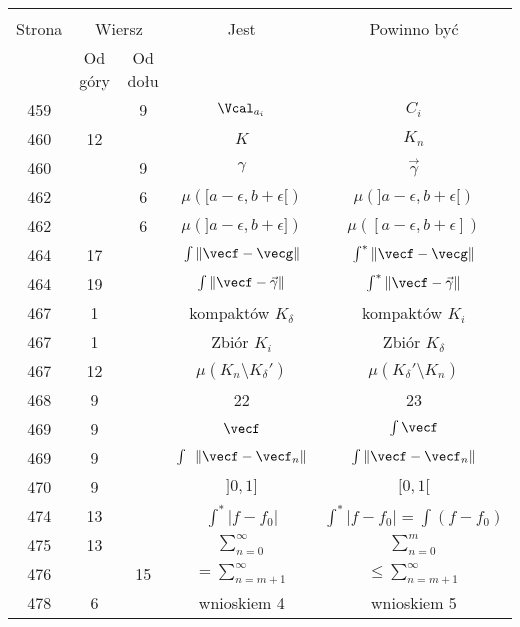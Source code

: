 \documentclass[a4paper,11pt]{article}
\numberwithin{equation}{section}
\begin{document}
\begin{center}
  \begin{tabular}{|c|c|c|c|c|}
    \hline
    & \multicolumn{2}{c|}{} & & \\
    Strona & \multicolumn{2}{c|}{Wiersz} & Jest
                              & Powinno być \\ \cline{2-3}
    & Od góry & Od dołu & & \\
    \hline
    459 & &  9 & $\Vcal_{ a_{ i } }$ & $C_{ i }$ \\
    460 & 12 & & $K$ & $K_{ n }$ \\
    460 & &  9 & $\gamma$ & $\vec{ \gamma }$ \\
    462 & &  6 & $\mu( [ a - \epsilon, b + \epsilon [ )$
           & $\mu( ] a - \epsilon, b + \epsilon [ )$ \\
    462 & &  6 & $\mu( ] a - \epsilon, b + \epsilon ] )$
           & $\mu( [ a - \epsilon, b + \epsilon ] )$ \\
    464 & 17 & & $\int \Vert \vecf - \vecg \Vert$
           & $\int^{ * } \Vert \vecf - \vecg \Vert$ \\
    464 & 19 & & $\int \Vert \vecf - \vec{ \gamma } \Vert$
           & $\int^{ * } \Vert \vecf - \vec{ \gamma } \Vert$ \\
    467 &  1 & & kompaktów $K_{ \delta }$ & kompaktów $K_{ i }$ \\
    467 &  1 & & Zbiór $K_{ i }$ & Zbiór $K_{ \delta }$ \\
    467 & 12 & & $\mu( K_{ n } \setminus K_{ \delta }' )$
           & $\mu( K_{ \delta }' \setminus K_{ n } )$ \\
    468 &  9 & & 22 & 23 \\
    469 &  9 & & $\vecf$ & $\int \vecf$ \\
    469 &  9 & & $\int\:\; \Vert \vecf - \vecf_{ n } \Vert$
           & $\int \Vert \vecf - \vecf_{ n } \Vert$ \\
    470 &  9 & & $] 0, 1 ]$ & $[ 0, 1 [$ \\
    474 & 13 & & $\int^{ * } | f - f_{ 0 } |$
           & $\int^{ * } | f - f_{ 0 } | = \int ( f - f_{ 0 } )$ \\
    475 & 13 & &  $\sum_{ n = 0 }^{ \infty }$ & $\sum_{ n = 0 }^{ m }$ \\
    476 & & 15 & $= \sum^{ \infty }_{ n = m + 1 }$
           & $\leq \sum^{ \infty }_{ n = m + 1 }$ \\
    478 &  6 & & wnioskiem 4 & wnioskiem 5 \\

\end{tabular}
\end{center}
\end{document}
